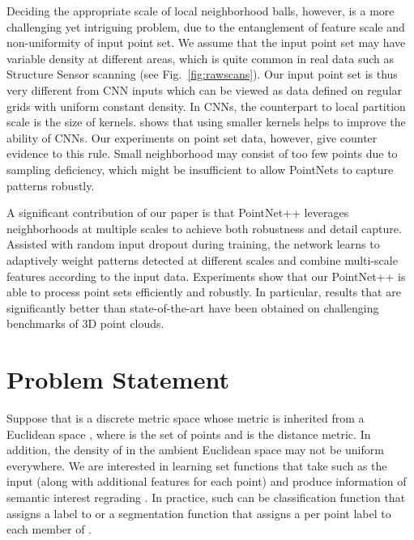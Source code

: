 \documentclass{article}
\begin{document}
Deciding the appropriate scale of local neighborhood balls, however, is a more challenging yet intriguing problem, due to the entanglement of feature scale and non-uniformity of input point set. We assume that the input point set may have variable density at different areas, which is quite common in real data such as Structure Sensor scanning \cite{occipital2016structure} (see Fig.~\ref{fig:rawscans}).  Our input point set is thus very different from CNN inputs which can be viewed as data defined on regular grids with uniform constant density. In CNNs, the counterpart to local partition scale is the size of kernels. \cite{simonyan2014very} shows that using smaller kernels helps to improve the ability of CNNs. Our experiments on point set data, however, give counter evidence to this rule. Small neighborhood may consist of too few points due to sampling deficiency, which might be insufficient to allow PointNets to capture patterns robustly. 

A significant contribution of our paper is that PointNet++ leverages neighborhoods at multiple scales to achieve both robustness and detail capture. Assisted with random input dropout during training, the network learns to adaptively weight patterns detected at different scales and combine multi-scale features according to the input data. Experiments show that our PointNet++ is able to process point sets efficiently and robustly. In particular, results that are significantly better than state-of-the-art have been obtained on challenging benchmarks of 3D point clouds.






















%
 

\section{Problem Statement}
Suppose that  is a discrete metric space whose metric is inherited from a Euclidean space , where  is the set of points and  is the distance metric. In addition, the density of  in the ambient Euclidean space may not be uniform everywhere. We are interested in learning set functions  that take such  as the input (along with additional features for each point) and produce information of semantic interest regrading . In practice, such  can be classification function that assigns a label to  or a segmentation function that assigns a per point label to each member of .
\end{document}
